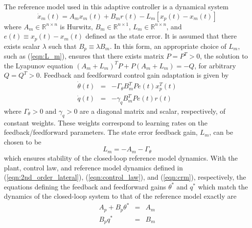 The reference model used in this adaptive controller is a dynamical system 
\begin{equation}
	\dot{x}_m(t) = A_m x_m(t) + B_m r(t) - L_m \left[x_p(t) - x_m(t)\right]
	\label{eqn:crm}
\end{equation} %
\noindent where $A_m \in \mathbb{R}^{n \times n}$ is Hurwitz, $B_m \in \mathbb{R}^{n \times 1}$, $L_m \in \mathbb{R}^{n \times n}$, and $e(t) \equiv x_p(t) - x_m(t)$ defined as the state error. It is assumed that there exists scalar $\lambda$ such that $B_p \equiv \lambda B_m$. In this form, an appropriate choice of $L_m$, such as (\ref{eqn:L_m}), ensures that there exists matrix $P = P^T > 0$, the solution to the Lyapunov equation $(A_m + L_m)^T P + P(A_m + L_m) = - Q$, for arbitrary $Q = Q^T > 0$. Feedback and feedforward control gain adaptation is given by
\begin{eqnarray}
	\dot{\theta}(t) &=& - \Gamma_\theta B_m^T P e(t) x_p^T(t) \label{eqn:adaptive_law_theta}\\
	\dot{q}(t) &=& - \gamma_q B_m^T P e(t) r(t)
	\label{eqn:adaptive_law_gamma}
\end{eqnarray}
\noindent where $\Gamma_\theta > 0$ and $\gamma_q > 0$ are a diagonal matrix and scalar, respectively, of constant weights. These weights correspond to learning rates on the feedback/feedforward parameters. The state error feedback gain, $L_m$, can be chosen to be
\begin{equation}
	L_m = - A_m - \Gamma_\theta
	\label{eqn:L_m}
\end{equation}
\noindent which ensures stability of the closed-loop reference model dynamics. With the plant, control law, and reference model dynamics defined in (\ref{eqn:2nd_order_lateral}), (\ref{eqn:control_law}), and (\ref{eqn:crm}), respectively, the equations defining the feedback and feedforward gains $\theta^*$ and $q^*$ which match the dynamics of the closed-loop system to that of the reference model exactly are 
\begin{eqnarray}
	A_p + B_p \theta^* &=& A_m \label{eqn:matchcond1} \\
	B_p q^* &=& B_m \label{eqn:matchcond2} 
\end{eqnarray}

